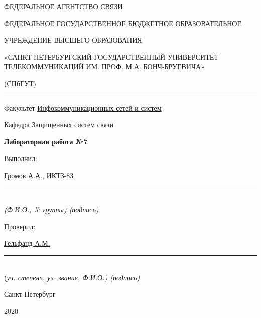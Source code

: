\documentclass[a4paper,14pt]{extarticle}
\begin{document}
    \begin{center}
        \thispagestyle{empty}
        \begin{singlespace}
        ФЕДЕРАЛЬНОЕ АГЕНТСТВО СВЯЗИ

        ФЕДЕРАЛЬНОЕ ГОСУДАРСТВЕННОЕ БЮДЖЕТНОЕ ОБРАЗОВАТЕЛЬНОЕ

        УЧРЕЖДЕНИЕ ВЫСШЕГО ОБРАЗОВАНИЯ

        «САНКТ-ПЕТЕРБУРГСКИЙ ГОСУДАРСТВЕННЫЙ УНИВЕРСИТЕТ ТЕЛЕКОММУНИКАЦИЙ ИМ. ПРОФ. М.А. БОНЧ-БРУЕВИЧА»

        (СПбГУТ)
        \end{singlespace}
        \vspace{-1ex}
        \rule{\textwidth}{0.4pt}
        \vspace{-5ex}

        Факультет \underline{Инфокоммуникационных сетей и систем}

        Кафедра \underline{Защищенных систем связи}
        \vspace{10ex}

        \textbf{Лабораторная работа №7}

    \end{center}
    \vspace{4ex}
    \begin{flushright}
    \parbox{8cm}{
    \begin{flushleft}
        Выполнил:

        \underline{Громов А.А., ИКТЗ-83} \hfill \rule[-0.85ex]{0.1\textwidth}{0.6pt}\\
        \vspace{-1ex}
        \footnotesize \textit{ (Ф.И.О., № группы) \hfill (подпись)} \normalsize

        Проверил:

        \underline{Гельфанд А.М.} \hfill \rule[-0.85ex]{0.1\textwidth}{0.6pt}\\
        \vspace{-1ex}
        (\footnotesize \textit{уч. степень, уч. звание, Ф.И.О.) \hfill (подпись)} \normalsize

    \end{flushleft}
    }
    \end{flushright}
    \begin{center}
        \vfill
        Санкт-Петербург

        2020

        \end{center}
\end{document}
